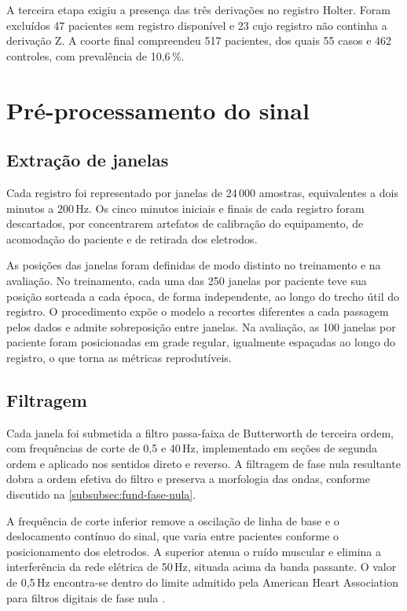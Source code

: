 A terceira etapa exigiu a presença das três derivações no registro Holter.
Foram excluídos 47 pacientes sem registro disponível e 23 cujo registro não
continha a derivação Z. A coorte final compreendeu 517 pacientes, dos quais
55 casos e 462 controles, com prevalência de 10,6\,\%.

\section{Pré-processamento do sinal}
\label{sec:met-preprocessamento}

\subsection{Extração de janelas}
\label{subsec:met-janelas}

Cada registro foi representado por janelas de 24\,000 amostras, equivalentes
a dois minutos a 200\,Hz. Os cinco minutos iniciais e finais de cada registro
foram descartados, por concentrarem artefatos de calibração do equipamento,
de acomodação do paciente e de retirada dos eletrodos.

As posições das janelas foram definidas de modo distinto no treinamento e na
avaliação. No treinamento, cada uma das 250 janelas por paciente teve sua
posição sorteada a cada época, de forma independente, ao longo do trecho
útil do registro. O procedimento expõe o modelo a recortes diferentes a cada
passagem pelos dados e admite sobreposição entre janelas. Na avaliação, as
100 janelas por paciente foram posicionadas em grade regular, igualmente
espaçadas ao longo do registro, o que torna as métricas reprodutíveis.

\subsection{Filtragem}
\label{subsec:met-filtragem}

Cada janela foi submetida a filtro passa-faixa de Butterworth de terceira
ordem, com frequências de corte de 0,5 e 40\,Hz, implementado em seções de
segunda ordem e aplicado nos sentidos direto e reverso. A filtragem de fase
nula resultante dobra a ordem efetiva do filtro e preserva a morfologia das
ondas, conforme discutido na \autoref{subsubsec:fund-fase-nula}.

A frequência de corte inferior remove a oscilação de linha de base e o
deslocamento contínuo do sinal, que varia entre pacientes conforme o
posicionamento dos eletrodos. A superior atenua o ruído muscular e elimina a
interferência da rede elétrica de 50\,Hz, situada acima da banda passante. O
valor de 0,5\,Hz encontra-se dentro do limite admitido pela American Heart
Association para filtros digitais de fase nula
\cite{kligfield2007recommendations}.

